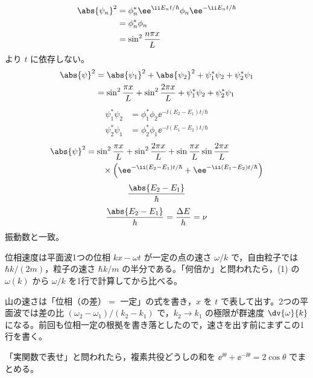 \begin{align*}
\abs{\psi_{n}}^{2}&=\phi_{n}^{*}\ee^{\ii E_{n}t/\hbar}\phi_{n}\ee^{-\ii E_{n}t/\hbar}\\
&=\phi_{n}^{*}\phi_{n}\\
&=\sin^{2}\frac{n\pi x}{L}
\end{align*}
より $t$ に依存しない。
\begin{align*}
\abs{\psi}^{2}&=\abs{\psi_{1}}^{2}+\abs{\psi_{2}}^{2}+\psi_{1}^{*}\psi_{2}+\psi_{2}^{*}\psi_{1}\\
&=\sin^{2}\frac{\pi x}{L}+\sin^{2}\frac{2\pi x}{L}+\psi_{1}^{*}\psi_{2}+\psi_{2}^{*}\psi_{1}
\end{align*}
\begin{align*}
\psi_{1}^{*}\psi_{2}&=\phi_{1}^{*}\phi_{2}\ee^{-\ii(E_{2}-E_{1})t/\hbar}\\
\psi_{2}^{*}\psi_{1}&=\phi_{2}^{*}\phi_{1}\ee^{-\ii(E_{1}-E_{2})t/\hbar}
\end{align*}
\begin{align*}
\abs{\psi}^{2}&=\sin^{2}\frac{\pi x}{L}+\sin^{2}\frac{2\pi x}{L}+\sin\frac{\pi x}{L}\sin\frac{2\pi x}{L}\\
&\qquad\times\left(\ee^{-\ii(E_{2}-E_{1})t/\hbar}+\ee^{-\ii(E_{1}-E_{2})t/\hbar}\right)
\end{align*}
\[ \frac{\abs{E_{2}-E_{1}}}{\hbar} \]
\[ \frac{\abs{E_{2}-E_{1}}}{h}=\frac{\Delta E}{h}=\nu \]
振動数と一致。
\item 位相速度は平面波1つの位相 $kx-\omega t$ が一定の点の速さ $\omega/k$ で，自由粒子では $\hbar k/(2m)$，粒子の速さ $\hbar k/m$ の半分である。「何倍か」と問われたら，(1) の $\omega(k)$ から $\omega/k$ を1行で計算してから比べる。
\item {} 山の速さは「位相（の差）$=$ 一定」の式を書き，$x$ を $t$ で表して出す。2つの平面波では差の比 $(\omega_{2}-\omega_{1})/(k_{2}-k_{1})$ で，$k_{2}\to k_{1}$ の極限が群速度 $\dv{\omega}{k}$ になる。前回も位相一定の根拠を書き落としたので，速さを出す前にまずこの1行を書く。
\item 「実関数で表せ」と問われたら，複素共役どうしの和を $\ee^{\ii\theta}+\ee^{-\ii\theta}=2\cos\theta$ でまとめる。
